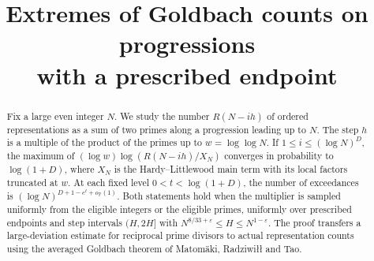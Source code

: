 \documentclass[11pt]{article}
\title{Extremes of Goldbach counts on progressions\\ with a prescribed endpoint}
\author{}
\date{}
\begin{document}
\maketitle
\begin{abstract}
Fix a large even integer \(N\). We study the number \(R(N-ih)\) of ordered
representations as a sum of two primes along a progression leading up to \(N\).
The step \(h\) is a multiple of the product of the primes up to
\(w=\log\log N\). If \(1\le i\le(\log N)^D\), the maximum of
\((\log w)\log(R(N-ih)/X_N)\) converges in probability to \(\log(1+D)\),
where \(X_N\) is the Hardy--Littlewood main term with its local factors
truncated at \(w\). At each fixed level \(0<t<\log(1+D)\), the number
of exceedances is \((\log N)^{D+1-e^t+o_{\mathbb P}(1)}\).
Both statements hold when the multiplier is sampled uniformly from the
eligible integers or the eligible primes, uniformly over prescribed
endpoints and step intervals \((H,2H]\) with
\(N^{8/33+\varepsilon}\le H\le N^{1-\varepsilon}\).
The proof transfers a large-deviation estimate for reciprocal prime divisors
to actual representation counts using the averaged Goldbach theorem of
Matom\"aki, Radziwi{\l}{\l} and Tao.
\end{abstract}




\end{document}
